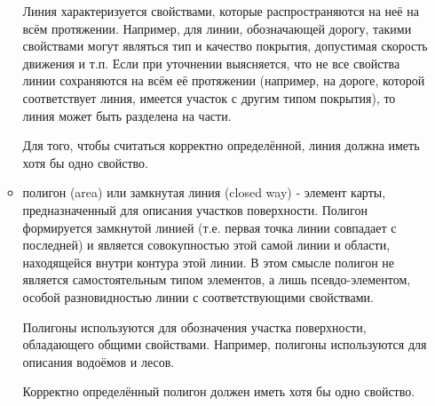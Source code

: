 \documentclass[12pt,a4paper,oneside]{article} %
\begin{document}
\begin{enumerate}
\begin{itemize}
Линия характеризуется свойствами, которые распространяются на \linebreak
неё на всём протяжении. Например, для линии, обозначающей \linebreak
дорогу, такими свойствами могут являться тип и качество покрытия, \linebreak
допустимая скорость движения и т.п. Если при уточнении \linebreak
выясняется, что не все свойства линии сохраняются на всём её \linebreak
протяжении (например, на дороге, которой соответствует линия, \linebreak
имеется участок с другим типом покрытия), то линия может быть \linebreak
разделена на части.

Для того, чтобы считаться корректно определённой, линия должна \linebreak
иметь хотя бы одно свойство.

\item полигон (area) или замкнутая линия (closed way) - элемент \linebreak
карты, предназначенный для описания участков поверхности. \linebreak
Полигон формируется замкнутой линией  (т.е. первая точка линии \linebreak
совпадает с последней) и является совокупностью этой самой \linebreak
линии и области, находящейся внутри контура этой линии. В этом \linebreak
смысле полигон не является самостоятельным типом элементов, \linebreak
а лишь псевдо-элементом, особой разновидностью линии с \linebreak
соответствующими свойствами.

Полигоны используются для обозначения участка поверхности, \linebreak
обладающего общими свойствами. Например, полигоны \linebreak
используются для описания водоёмов и лесов.

Корректно определённый полигон должен иметь хотя бы одно \linebreak
свойство.


\end{itemize}
\end{enumerate}
\end{document}
